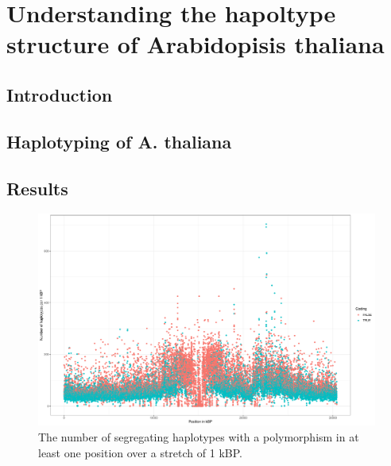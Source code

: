 
\chapter{Understanding the hapoltype structure of Arabidopisis thaliana } %

\label{Chapter1} %




\section{Introduction}

\section{Haplotyping of A. thaliana}

\section{Results}

\begin{figure}[th]
\centering
\includegraphics[height=.55\textheight, width=1.1\textwidth]{Figures/chr1_hap}
\decoRule
\caption[Haplotype strutcture of chromosome 1 of \textit{A. thaliana}]{The number of segregating haplotypes with a polymorphism in at least one position over a stretch of 1 kBP. }
\label{fig:time_marker}
\end{figure}



